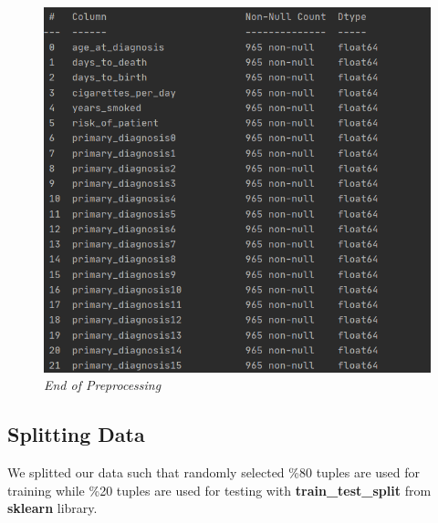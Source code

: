 \documentclass[onecolumn]{article}
\begin{document}
\begin{figure}[h]
\begin{minipage}{0.4\textwidth}
        \includegraphics[width=1.0\textwidth]{afterpreprocessnotnull.png} %
    \end{minipage}
    \bigbreak
    \caption{\emph{End of Preprocessing}}
\end{figure}

\subsection{Splitting Data}
We splitted our data such that randomly selected \%80 tuples are used for training while \%20 tuples are used for testing with \textbf{train\_test\_split} from \textbf{sklearn} library.
\end{document}
